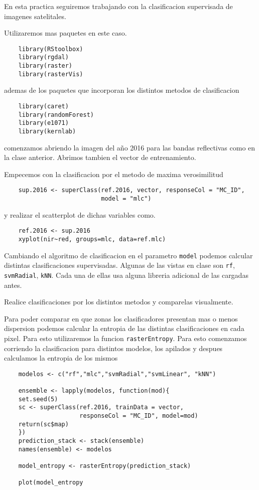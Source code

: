 En esta practica seguiremos trabajando con la clasificacion supervisada de
imagenes satelitales.

Utilizaremos mas paquetes en este caso.

\begin{lstlisting}
    library(RStoolbox)
    library(rgdal)
    library(raster)
    library(rasterVis)
\end{lstlisting}

ademas de los paquetes que incorporan los distintos metodos de clasificacion

\begin{lstlisting}
    library(caret)
    library(randomForest)
    library(e1071)
    library(kernlab)
\end{lstlisting}

comenzamos abriendo la imagen del año 2016 para las bandas reflectivas como en
la clase anterior. Abrimos tambien el vector de entrenamiento.

Empecemos con la clasificacion por el metodo de maxima verosimilitud

\begin{lstlisting}
    sup.2016 <- superClass(ref.2016, vector, responseCol = "MC_ID", 
                           model = "mlc")
\end{lstlisting}

y realizar el scatterplot de dichas variables como.

\begin{lstlisting}
    ref.2016 <- sup.2016
    xyplot(nir~red, groups=mlc, data=ref.mlc)
\end{lstlisting}

Cambiando el algoritmo de clasificacion en el parametro \texttt{model} podemos
calcular distintas clasificaciones supervisadas. Algunas de las vistas en clase
son \texttt{rf}, \texttt{svmRadial}, \texttt{kNN}. Cada una de ellas usa alguna
libreria adicional de las cargadas antes.

\begin{act}
    Realice clasificaciones por los distintos metodos y comparelas visualmente. 
\end{act}

Para poder comparar en que zonas los clasificadores presentan mas o menos
dispersion podemos calcular la entropia de las distintas clasificaciones en cada
pixel. Para esto utilizaremos la funcion \texttt{rasterEntropy}. Para esto
comenzamos corriendo la clasificacion para distintos modelos, los apilados y
despues calculamos la entropia de los mismos

\begin{lstlisting}
    modelos <- c("rf","mlc","svmRadial","svmLinear", "kNN")
      
    ensemble <- lapply(modelos, function(mod){
    set.seed(5)
    sc <- superClass(ref.2016, trainData = vector,
                     responseCol = "MC_ID", model=mod)
    return(sc$map)
    })
    prediction_stack <- stack(ensemble)
    names(ensemble) <- modelos
    
    model_entropy <- rasterEntropy(prediction_stack)

    plot(model_entropy
\end{lstlisting}

